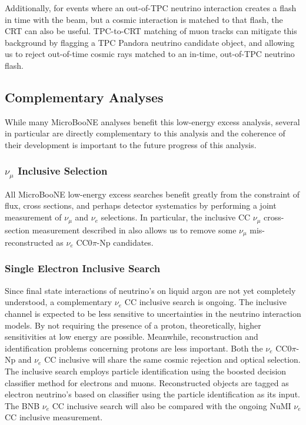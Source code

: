 Additionally, for events where an out-of-TPC neutrino interaction creates a flash in time with the beam, but a cosmic interaction is matched to that flash, the CRT can also be useful.  TPC-to-CRT matching of muon tracks can mitigate this background by flagging a TPC Pandora neutrino candidate object, and allowing us to reject out-of-time cosmic rays matched to an in-time, out-of-TPC neutrino flash.

\subsection{Complementary Analyses}

While many MicroBooNE analyses benefit this low-energy excess analysis, several in particular are directly complementary to this analysis and the coherence of their development is important to the future progress of this analysis.

\subsubsection{\texorpdfstring{$\nu_{\mu}$}{numu} Inclusive Selection}

All MicroBooNE low-energy excess searches benefit greatly from the constraint of flux, cross sections, and perhaps detector systematics by performing a joint measurement of $\nu_\mu$ and $\nu_e$ selections. In particular, the inclusive CC $\nu_\mu$ cross-section measurement described in \cite{ubxsec} also allows us to remove some $\nu_\mu$ mis-reconstructed as $\nu_e$ CC0$\pi$-Np candidates.

\subsubsection{Single Electron Inclusive Search}

Since final state interactions of neutrino's on liquid argon are not yet completely understood, a complementary $\nu_e$ CC inclusive search is ongoing. The inclusive channel is expected to be less sensitive to uncertainties in the neutrino interaction models. By not requiring the presence of a proton, theoretically, higher sensitivities at low energy are possible. Meanwhile, reconstruction and identification problems concerning protons are less important. Both the $\nu_e$ CC0$\pi$-Np and $\nu_e$ CC inclusive will share the same cosmic rejection and optical selection. The inclusive search employs particle identification using the boosted decision classifier method for electrons and muons. Reconstructed objects are tagged as electron neutrino's based on classifier using the particle identification as its input. The BNB $\nu_e$ CC inclusive search will also be compared with the ongoing NuMI $\nu_e$ CC inclusive measurement.

